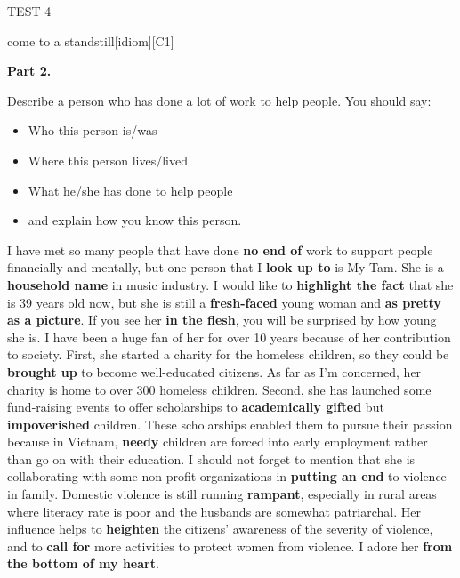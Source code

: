 \begin{glossarymc}[Cambridge 9]
\begin{test}{TEST 4}
\begin{VocabExplain}[Part 1]
            \begin{ExplainCard}{come to a standstill}[idiom][C1]
            \end{ExplainCard}
        \end{VocabExplain}

    \noindent
    \textbf{Part 2.}
    \begin{qa}{Describe a person who has done a lot of work to help people. You should say:}
    \begin{itemize}
    \item Who this person is/was
    \item Where this person lives/lived
    \item What he/she has done to help people
    \item and explain how you know this person.
    \end{itemize}

    I have met so many people that have done \textbf{no end of} work to support people financially and mentally, but one person that I \textbf{look up to} is My Tam. She is a \textbf{household name} in music industry. I would like to \textbf{highlight the fact} that she is 39 years old now, but she is still a \textbf{fresh-faced} young woman and \textbf{as pretty as a picture}. If you see her \textbf{in the flesh}, you will be surprised by how young she is. I have been a huge fan of her for over 10 years because of her contribution to society. First, she started a charity for the homeless children, so they could be \textbf{brought up} to become well-educated citizens. As far as I'm concerned, her charity is home to over 300 homeless children. Second, she has launched some fund-raising events to offer scholarships to \textbf{academically gifted} but \textbf{impoverished} children. These scholarships enabled them to pursue their passion because in Vietnam, \textbf{needy} children are forced into early employment rather than go on with their education. I should not forget to mention that she is collaborating with some non-profit organizations in \textbf{putting an end} to violence in family. Domestic violence is still running \textbf{rampant}, especially in rural areas where literacy rate is poor and the husbands are somewhat patriarchal. Her influence helps to \textbf{heighten} the citizens' awareness of the severity of violence, and to \textbf{call for} more activities to protect women from violence. I adore her \textbf{from the bottom of my heart}.
    \end{qa}


\end{test}
\end{glossarymc}
